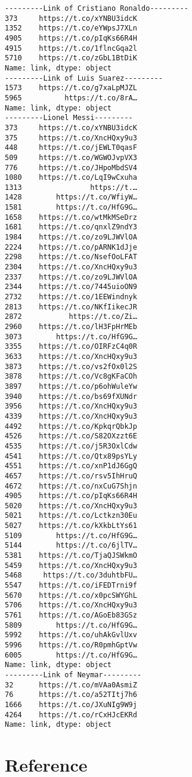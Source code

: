 \documentclass[11pt]{article}
\begin{document}
    \begin{Verbatim}[commandchars=\\\{\}]
---------Link of Cristiano Ronaldo---------
373     https://t.co/xYNBU3idcK
1352    https://t.co/eYWpsJ7XLn
4905    https://t.co/pIqKs66R4H
4915    https://t.co/1flncGqa2l
5710    https://t.co/zGbL1BtDiK
Name: link, dtype: object
---------Link of Luis Suarez---------
1573    https://t.co/g7xaLpMJZL
5965          https://t.co/8rA…
Name: link, dtype: object
---------Lionel Messi---------
373     https://t.co/xYNBU3idcK
375     https://t.co/XncHQxy9u3
448     https://t.co/jEWLT0qasF
509     https://t.co/WGWOJvpVX3
776     https://t.co/JHpoMbdSV4
1080    https://t.co/LqI9wCxuha
1313                https://t.…
1428        https://t.co/WfiyW…
1581        https://t.co/HfG9G…
1658    https://t.co/wtMkMSeDrz
1681    https://t.co/qnxlZ9ndY3
1984    https://t.co/zo9LJWVlOA
2224    https://t.co/pARNK1dJje
2298    https://t.co/NsefOoLFAT
2304    https://t.co/XncHQxy9u3
2337    https://t.co/zo9LJWVlOA
2344    https://t.co/7445uioON9
2732    https://t.co/1EEWindnyk
2813    https://t.co/NKfIikecJR
2872           https://t.co/Zi…
2960    https://t.co/lH3FpHrMEb
3073        https://t.co/HfG9G…
3355    https://t.co/OIRFzC4q0R
3633    https://t.co/XncHQxy9u3
3873    https://t.co/vs2fOx0l2S
3878    https://t.co/Vc8gKFaCOh
3897    https://t.co/p6ohWuleYw
3940    https://t.co/bs69fXUNdr
3956    https://t.co/XncHQxy9u3
4339    https://t.co/XncHQxy9u3
4492    https://t.co/KpkqrQbkJp
4526    https://t.co/S82OXzzt6E
4535    https://t.co/j5R3OxlCdw
4541    https://t.co/Qtx89psYLy
4551    https://t.co/xnP1dJ6GgQ
4657    https://t.co/rsv5IhHruQ
4672    https://t.co/nxCuG7Shjn
4905    https://t.co/pIqKs66R4H
5020    https://t.co/XncHQxy9u3
5021    https://t.co/Lctkzn30Eu
5027    https://t.co/kXkbLtYs61
5109        https://t.co/HfG9G…
5144        https://t.co/6jlTV…
5381    https://t.co/TjaQJSWkmO
5459    https://t.co/XncHQxy9u3
5468     https://t.co/3duhtbFU…
5547    https://t.co/iFEDTrni9f
5670    https://t.co/x0pcSWYGhL
5706    https://t.co/XncHQxy9u3
5761    https://t.co/AGoEb83GSz
5809        https://t.co/HfG9G…
5992    https://t.co/uhAkGvlUxv
5996    https://t.co/R0pmhGptVw
6005        https://t.co/HfG9G…
Name: link, dtype: object
---------Link of Neymar---------
32      https://t.co/mVAa0AsmiZ
76      https://t.co/a52TItj7h6
1666    https://t.co/JXuNIg9W9j
4264    https://t.co/rCxHJcEKRd
Name: link, dtype: object

    \end{Verbatim}

    \section{Reference}\label{reference}
\end{document}
